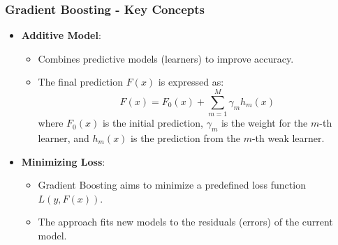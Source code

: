 \documentclass[aspectratio=169]{beamer}
\begin{document}
\begin{frame}[fragile]
    \frametitle{Gradient Boosting - Key Concepts}
    \begin{itemize}
        \item \textbf{Additive Model}:
        \begin{itemize}
            \item Combines predictive models (learners) to improve accuracy.
            \item The final prediction $F(x)$ is expressed as:
            \begin{equation}
                F(x) = F_0(x) + \sum_{m=1}^{M} \gamma_m h_m(x)
            \end{equation}
            where $F_0(x)$ is the initial prediction, $\gamma_m$ is the weight for the $m$-th learner, and $h_m(x)$ is the prediction from the $m$-th weak learner.
        \end{itemize}
        \item \textbf{Minimizing Loss}:
        \begin{itemize}
            \item Gradient Boosting aims to minimize a predefined loss function $L(y, F(x))$.
            \item The approach fits new models to the residuals (errors) of the current model.
        \end{itemize}
    \end{itemize}
\end{frame}
\end{document}
